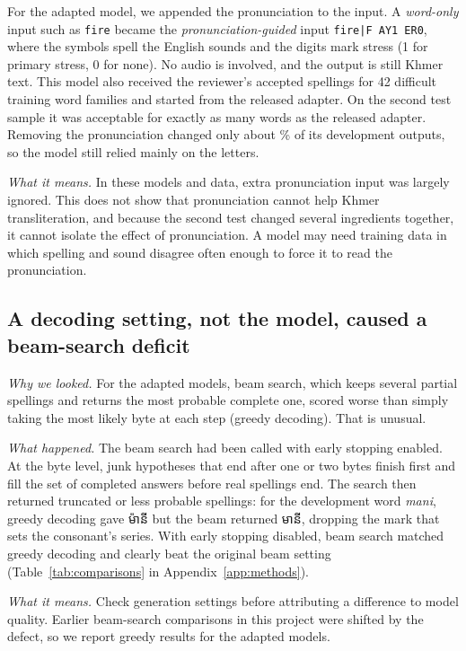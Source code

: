 \documentclass[10pt,a4paper,twocolumn]{article}
\newcommand{\km}[1]{{\khmerfont #1}}
\begin{document}
For the adapted model, we appended the pronunciation to the input. A \emph{word-only} input such as
\texttt{fire} became the \emph{pronunciation-guided} input \texttt{fire|F AY1 ER0}, where the symbols spell the
English sounds and the digits mark stress (1 for primary stress, 0 for none). No audio is involved, and the output
is still Khmer text. This model also received the reviewer's accepted spellings for 42 difficult training word families and
started from the released adapter. On the second test sample it was acceptable for exactly as many words as the
released adapter. Removing the pronunciation changed only about \% of its development outputs,
so the model still relied mainly on the letters.

\emph{What it means.} In these models and data, extra pronunciation input was largely ignored. This does not show
that pronunciation cannot help Khmer transliteration, and because the second test changed several ingredients
together, it cannot isolate the effect of pronunciation. A model may need training data in which spelling and sound
disagree often enough to force it to read the pronunciation.

\subsection{A decoding setting, not the model, caused a beam-search deficit}
\label{sec:res-decode}
\emph{Why we looked.} For the adapted models, beam search, which keeps several partial spellings and returns the
most probable complete one, scored worse than simply taking the most likely byte at each step (greedy decoding).
That is unusual.

\emph{What happened.} The beam search had been called with early stopping enabled. At the byte level, junk
hypotheses that end after one or two bytes finish first and fill the set of completed answers before real spellings
end. The search then returned truncated or less probable spellings: for the development word \emph{mani}, greedy
decoding gave \km{ម៉ានី} but the beam returned \km{មានី}, dropping the mark that sets the consonant's series. With
early stopping disabled, beam search matched greedy decoding and clearly beat the original beam setting
(Table~\ref{tab:comparisons} in Appendix~\ref{app:methods}).

\emph{What it means.} Check generation settings before attributing a difference to model quality. Earlier beam-search
comparisons in this project were shifted by the defect, so we report greedy results for the adapted models.
\end{document}
